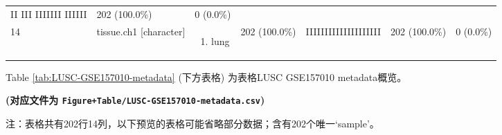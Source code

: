 \documentclass[
]{article}
\providecommand{\tightlist}{%
  \setlength{\itemsep}{0pt}\setlength{\parskip}{0pt}}
\begin{document}
\begin{longtable}[]{@{}lllllll@{}}
\begin{minipage}[t]{0.14\columnwidth}
II
III
IIIIIII
IIIIII\strut
\end{minipage} & \begin{minipage}[t]{0.07\columnwidth}\raggedright
202
(100.0\%)\strut
\end{minipage} & \begin{minipage}[t]{0.07\columnwidth}\raggedright
0
(0.0\%)\strut
\end{minipage}\tabularnewline
\begin{minipage}[t]{0.03\columnwidth}\raggedright
14\strut
\end{minipage} & \begin{minipage}[t]{0.16\columnwidth}\raggedright
tissue.ch1
{[}character{]}\strut
\end{minipage} & \begin{minipage}[t]{0.20\columnwidth}\raggedright
\begin{enumerate}
\def\labelenumi{\arabic{enumi}.}
\tightlist
\item
  lung
\end{enumerate}\strut
\end{minipage} & \begin{minipage}[t]{0.14\columnwidth}\raggedright
202 (100.0\%)\strut
\end{minipage} & \begin{minipage}[t]{0.14\columnwidth}\raggedright
IIIIIIIIIIIIIIIIIIII\strut
\end{minipage} & \begin{minipage}[t]{0.07\columnwidth}\raggedright
202
(100.0\%)\strut
\end{minipage} & \begin{minipage}[t]{0.07\columnwidth}\raggedright
0
(0.0\%)\strut
\end{minipage}\tabularnewline
\bottomrule
\end{longtable}

\begin{center}\vspace{1.5cm}\end{center}

Table \ref{tab:LUSC-GSE157010-metadata} (下方表格) 为表格LUSC GSE157010 metadata概览。

\textbf{(对应文件为 \texttt{Figure+Table/LUSC-GSE157010-metadata.csv})}

\begin{center}\begin{tcolorbox}[colback=gray!10, colframe=gray!50, width=0.9\linewidth, arc=1mm, boxrule=0.5pt]注：表格共有202行14列，以下预览的表格可能省略部分数据；含有202个唯一`sample'。
\end{tcolorbox}
\end{center}
\end{document}
